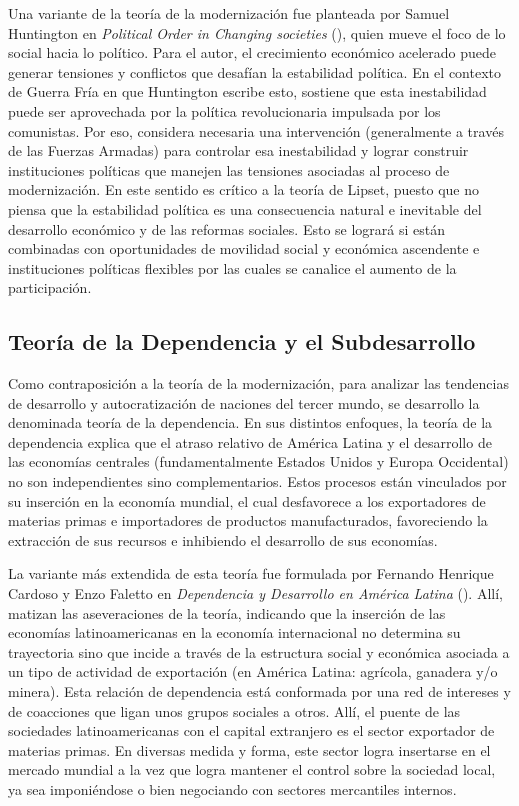 \documentclass{article}
\begin{document}
Una variante de la teoría de la modernización fue planteada por Samuel Huntington 
en \textit{Political Order in Changing societies} (\citeyear{huntington68political}),
quien mueve el foco de lo social hacia lo político. Para el autor, el crecimiento 
económico acelerado puede generar tensiones y conflictos que desafían la estabilidad
política. En el contexto de Guerra Fría en que Huntington escribe esto, sostiene que
esta inestabilidad puede ser aprovechada por la política revolucionaria impulsada por
los comunistas. Por eso, considera necesaria una intervención (generalmente a través
de las Fuerzas Armadas) para controlar esa inestabilidad y lograr construir instituciones
políticas que manejen las tensiones asociadas al proceso de modernización. En este 
sentido es crítico a la teoría de Lipset, puesto que no piensa que la estabilidad política
es una consecuencia natural e inevitable del desarrollo económico y de las reformas 
sociales. Esto se logrará si están combinadas con oportunidades de movilidad social y
económica ascendente e instituciones políticas flexibles por las cuales se canalice
el aumento de la participación.

\subsection{Teoría de la Dependencia y el Subdesarrollo}

Como contraposición a la teoría de la modernización, para analizar las tendencias de
desarrollo y autocratización de naciones del tercer mundo, se desarrollo la denominada
teoría de la dependencia. En sus distintos enfoques, la teoría de la dependencia explica
que el atraso relativo de América Latina y el desarrollo de las economías centrales
(fundamentalmente Estados Unidos y Europa Occidental) no son independientes sino 
complementarios. Estos procesos están vinculados por su inserción en la economía mundial,
el cual desfavorece a los exportadores de materias primas e importadores de productos
manufacturados, favoreciendo la extracción de sus recursos e inhibiendo el desarrollo
de sus economías.

La variante más extendida de esta teoría fue formulada por Fernando Henrique Cardoso
y Enzo Faletto en \textit{Dependencia y Desarrollo en América Latina} 
(\citeyear{cardoso1979dependencia}). Allí, matizan las aseveraciones de la teoría, 
indicando que la inserción de las economías latinoamericanas en la economía internacional
no determina su trayectoria sino que incide a través de la estructura social y económica
asociada a un tipo de actividad de exportación (en América Latina: agrícola, ganadera y/o
minera). Esta relación de dependencia está conformada por una red de intereses y de 
coacciones que ligan unos grupos sociales a otros. Allí, el puente de las sociedades 
latinoamericanas con el capital extranjero es el sector exportador de materias primas. 
En diversas medida y forma, este sector logra insertarse en el mercado mundial a la vez 
que logra mantener el control sobre la sociedad local, ya sea imponiéndose o bien 
negociando con sectores mercantiles internos.
\end{document}
